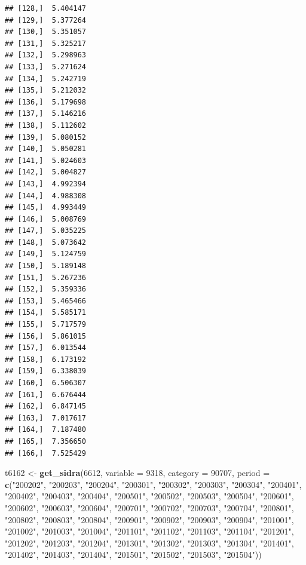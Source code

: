 \documentclass[]{article}
\newenvironment{Shaded}{\begin{snugshade}}{\end{snugshade}}
\newcommand{\DataTypeTok}[1]{\textcolor[rgb]{0.13,0.29,0.53}{#1}}
\newcommand{\DecValTok}[1]{\textcolor[rgb]{0.00,0.00,0.81}{#1}}
\newcommand{\KeywordTok}[1]{\textcolor[rgb]{0.13,0.29,0.53}{\textbf{#1}}}
\newcommand{\NormalTok}[1]{#1}
\newcommand{\StringTok}[1]{\textcolor[rgb]{0.31,0.60,0.02}{#1}}
\begin{document}
\begin{verbatim}
## [128,]  5.404147
## [129,]  5.377264
## [130,]  5.351057
## [131,]  5.325217
## [132,]  5.298963
## [133,]  5.271624
## [134,]  5.242719
## [135,]  5.212032
## [136,]  5.179698
## [137,]  5.146216
## [138,]  5.112602
## [139,]  5.080152
## [140,]  5.050281
## [141,]  5.024603
## [142,]  5.004827
## [143,]  4.992394
## [144,]  4.988308
## [145,]  4.993449
## [146,]  5.008769
## [147,]  5.035225
## [148,]  5.073642
## [149,]  5.124759
## [150,]  5.189148
## [151,]  5.267236
## [152,]  5.359336
## [153,]  5.465466
## [154,]  5.585171
## [155,]  5.717579
## [156,]  5.861015
## [157,]  6.013544
## [158,]  6.173192
## [159,]  6.338039
## [160,]  6.506307
## [161,]  6.676444
## [162,]  6.847145
## [163,]  7.017617
## [164,]  7.187480
## [165,]  7.356650
## [166,]  7.525429
\end{verbatim}

\begin{Shaded}
\begin{Highlighting}[]
\NormalTok{t6162 <-}\StringTok{ }\KeywordTok{get_sidra}\NormalTok{(}\DecValTok{6612}\NormalTok{, }\DataTypeTok{variable =} \DecValTok{9318}\NormalTok{, }\DataTypeTok{category =} \DecValTok{90707}\NormalTok{, }\DataTypeTok{period =} \KeywordTok{c}\NormalTok{(}\StringTok{"200202"}\NormalTok{, }\StringTok{"200203"}\NormalTok{, }\StringTok{"200204"}\NormalTok{, }\StringTok{"200301"}\NormalTok{, }\StringTok{"200302"}\NormalTok{, }\StringTok{"200303"}\NormalTok{, }\StringTok{"200304"}\NormalTok{, }\StringTok{"200401"}\NormalTok{, }\StringTok{"200402"}\NormalTok{, }\StringTok{"200403"}\NormalTok{, }\StringTok{"200404"}\NormalTok{, }\StringTok{"200501"}\NormalTok{, }\StringTok{"200502"}\NormalTok{, }\StringTok{"200503"}\NormalTok{, }\StringTok{"200504"}\NormalTok{, }\StringTok{"200601"}\NormalTok{, }\StringTok{"200602"}\NormalTok{, }\StringTok{"200603"}\NormalTok{, }\StringTok{"200604"}\NormalTok{, }\StringTok{"200701"}\NormalTok{, }\StringTok{"200702"}\NormalTok{, }\StringTok{"200703"}\NormalTok{, }\StringTok{"200704"}\NormalTok{, }\StringTok{"200801"}\NormalTok{, }\StringTok{"200802"}\NormalTok{, }\StringTok{"200803"}\NormalTok{, }\StringTok{"200804"}\NormalTok{, }\StringTok{"200901"}\NormalTok{, }\StringTok{"200902"}\NormalTok{, }\StringTok{"200903"}\NormalTok{, }\StringTok{"200904"}\NormalTok{, }\StringTok{"201001"}\NormalTok{, }\StringTok{"201002"}\NormalTok{, }\StringTok{"201003"}\NormalTok{, }\StringTok{"201004"}\NormalTok{, }\StringTok{"201101"}\NormalTok{, }\StringTok{"201102"}\NormalTok{, }\StringTok{"201103"}\NormalTok{, }\StringTok{"201104"}\NormalTok{, }\StringTok{"201201"}\NormalTok{, }\StringTok{"201202"}\NormalTok{, }\StringTok{"201203"}\NormalTok{, }\StringTok{"201204"}\NormalTok{, }\StringTok{"201301"}\NormalTok{, }\StringTok{"201302"}\NormalTok{, }\StringTok{"201303"}\NormalTok{, }\StringTok{"201304"}\NormalTok{, }\StringTok{"201401"}\NormalTok{, }\StringTok{"201402"}\NormalTok{, }\StringTok{"201403"}\NormalTok{, }\StringTok{"201404"}\NormalTok{, }\StringTok{"201501"}\NormalTok{, }\StringTok{"201502"}\NormalTok{, }\StringTok{"201503"}\NormalTok{, }\StringTok{"201504"}\NormalTok{))}
\end{Highlighting}
\end{Shaded}
\end{document}
